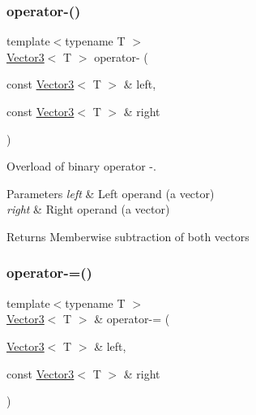 \subsubsection{\texorpdfstring{operator-\/()}{operator-()}\hspace{0.1cm}{\footnotesize\ttfamily [2/2]}}
{\footnotesize\ttfamily template$<$typename T $>$ \\
\hyperlink{classsf_1_1_vector3}{Vector3}$<$ T $>$ operator-\/ (\begin{DoxyParamCaption}\item[{const \hyperlink{classsf_1_1_vector3}{Vector3}$<$ T $>$ \&}]{left,  }\item[{const \hyperlink{classsf_1_1_vector3}{Vector3}$<$ T $>$ \&}]{right }\end{DoxyParamCaption})\hspace{0.3cm}{\ttfamily [related]}}



Overload of binary operator -\/. 


\begin{DoxyParams}{Parameters}
{\em left} & Left operand (a vector) \\
\hline
{\em right} & Right operand (a vector)\\
\hline
\end{DoxyParams}
\begin{DoxyReturn}{Returns}
Memberwise subtraction of both vectors 
\end{DoxyReturn}
\mbox{\label{classsf_1_1_vector3_aa465672d2a4ee5fd354e585cf08d2ab9}} 
\subsubsection{\texorpdfstring{operator-\/=()}{operator-=()}}
{\footnotesize\ttfamily template$<$typename T $>$ \\
\hyperlink{classsf_1_1_vector3}{Vector3}$<$ T $>$ \& operator-\/= (\begin{DoxyParamCaption}\item[{\hyperlink{classsf_1_1_vector3}{Vector3}$<$ T $>$ \&}]{left,  }\item[{const \hyperlink{classsf_1_1_vector3}{Vector3}$<$ T $>$ \&}]{right }\end{DoxyParamCaption})\hspace{0.3cm}{\ttfamily [related]}}



